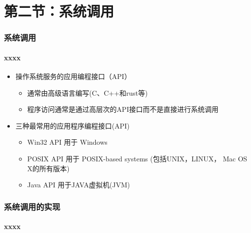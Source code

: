 \section{第二节：系统调用}%
\begin{frame}
	\frametitle{系统调用}
	\framesubtitle{xxxx}
    \begin{itemize}
        \item 操作系统服务的应用编程接口（API）
	    \begin{itemize}
        	\item 通常由高级语言编写(C、C++和rust等)
        	\item 程序访问通常是通过高层次的API接口而不是直接进行系统调用
    	\end{itemize}
        \item 三种最常用的应用程序编程接口(API)
	    \begin{itemize}
        	\item Win32 API 用于 Windows
        	\item POSIX API 用于 POSIX-based systems (包括UNIX，LINUX， Mac OS X的所有版本)
        	\item Java API 用于JAVA虚拟机(JVM)
    	\end{itemize}
    \end{itemize}
\end{frame}
\begin{frame}
	\frametitle{系统调用的实现}
	\framesubtitle{xxxx}
\end{frame}
